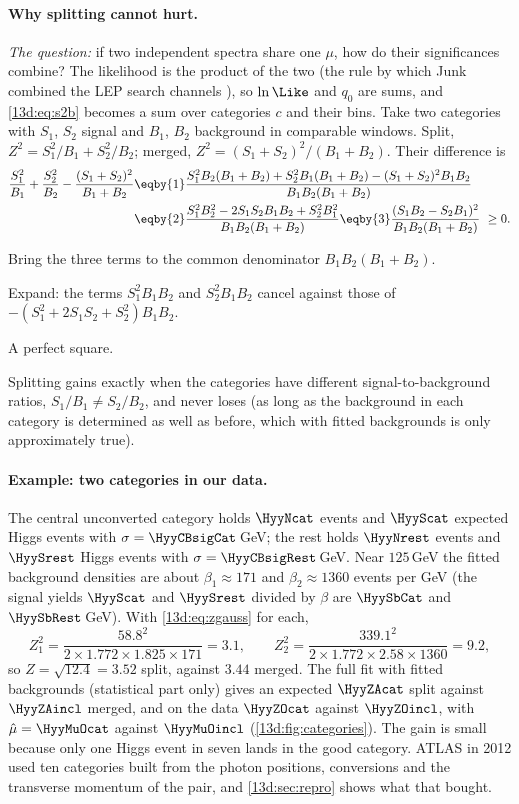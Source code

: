 \paragraph{Why splitting cannot hurt.}
\emph{The question:} if two independent spectra share one $\mu$, how do their
significances combine? The likelihood is the product of the two (the rule by which Junk
combined the LEP search channels \cite[(1)]{Junk1999}), so $\ln\Like$ and $q_0$
are sums, and \eqref{13d:eq:s2b} becomes a sum over categories $c$ and their bins. Take
two categories with $S_1$, $S_2$ signal and $B_1$, $B_2$ background in comparable windows.
Split, $Z^2=S_1^2/B_1+S_2^2/B_2$; merged, $Z^2=(S_1+S_2)^2/(B_1+B_2)$. Their difference is
\begin{align}
  \frac{S_1^2}{B_1}+\frac{S_2^2}{B_2}-\frac{(S_1+S_2)^2}{B_1+B_2}
  &\eqby{1} \frac{S_1^2B_2(B_1+B_2)+S_2^2B_1(B_1+B_2)-(S_1+S_2)^2B_1B_2}{B_1B_2(B_1+B_2)}
  \nonumber\\
  &\eqby{2} \frac{S_1^2B_2^2-2S_1S_2B_1B_2+S_2^2B_1^2}{B_1B_2(B_1+B_2)}
   \eqby{3} \frac{(S_1B_2-S_2B_1)^2}{B_1B_2(B_1+B_2)}\ \ge 0 .
  \label{13d:eq:split}
\end{align}
\begin{explain}
  \item Bring the three terms to the common denominator $B_1B_2(B_1+B_2)$.
  \item Expand: the terms $S_1^2B_1B_2$ and $S_2^2B_1B_2$ cancel against those of
        $-(S_1^2+2S_1S_2+S_2^2)B_1B_2$.
  \item A perfect square.
\end{explain}
Splitting gains exactly when the categories have different signal-to-background ratios,
$S_1/B_1\ne S_2/B_2$, and never loses (as long as the background in each category is
determined as well as before, which with fitted backgrounds is only approximately true).

\paragraph{Example: two categories in our data.}
The central unconverted category holds $\HyyNcat$ events and $\HyyScat$ expected Higgs
events with $\sigma=\HyyCBsigCat\,$GeV; the rest holds $\HyyNrest$ events and $\HyySrest$
Higgs events with $\sigma=\HyyCBsigRest\,$GeV. Near $125\,$GeV the fitted background densities are about $\beta_1\approx171$ and
$\beta_2\approx1360$ events per GeV (the signal yields $\HyyScat$ and $\HyySrest$ divided by
$\beta$ are $\HyySbCat$ and $\HyySbRest\,$GeV). With
\eqref{13d:eq:zgauss} for each,
\[
  Z_1^2=\frac{58.8^2}{2\times1.772\times1.825\times171}=3.1,\qquad
  Z_2^2=\frac{339.1^2}{2\times1.772\times2.58\times1360}=9.2,
\]
so $Z=\sqrt{12.4}=3.52$ split, against $3.44$ merged. The full fit with fitted backgrounds
(statistical part only) gives an expected $\HyyZAcat$ split against $\HyyZAincl$ merged,
and on the data $\HyyZOcat$ against $\HyyZOincl$, with $\hat\mu=\HyyMuOcat$ against
$\HyyMuOincl$ (\cref{13d:fig:categories}). The gain is small because only one Higgs event
in seven lands in the good category. ATLAS in 2012 used ten categories built from the
photon positions, conversions and the transverse momentum of the pair, and
\cref{13d:sec:repro} shows what that bought.

